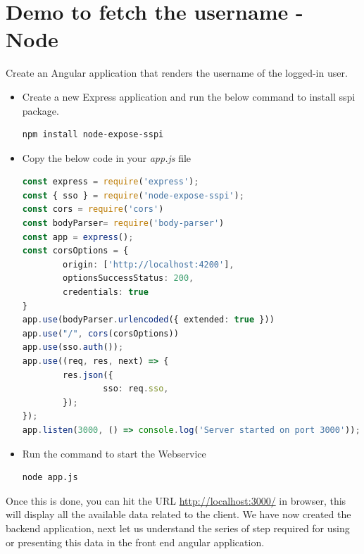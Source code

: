 \documentclass{report}
\begin{document}
\section{Demo to fetch the username - Node}
Create an Angular application that renders the username of the logged-in user.
\begin{itemize}
	\item{Create a new Express application and run the below command to install sspi package.}
	\begin{lstlisting}[language=bash]
		npm install node-expose-sspi
	\end{lstlisting}
\item{Copy the below code in your \textit{app.js} file}
		\begin{lstlisting}[language=Typescript, caption=app.js]
const express = require('express');
const { sso } = require('node-expose-sspi');
const cors = require('cors')
const bodyParser= require('body-parser')
const app = express();
const corsOptions = {
		origin: ['http://localhost:4200'],
		optionsSuccessStatus: 200,
		credentials: true
}
app.use(bodyParser.urlencoded({ extended: true }))
app.use("/", cors(corsOptions))
app.use(sso.auth());
app.use((req, res, next) => {
		res.json({
				sso: req.sso,
		});
});
app.listen(3000, () => console.log('Server started on port 3000'));
\end{lstlisting}
\item{Run the command to start the Webservice}
	\begin{lstlisting}[language=bash]
	node app.js
\end{lstlisting}
\end{itemize}
Once this is done, you can hit the URL \url{http://localhost:3000/} in browser, this will display all the available data related to the client.
We have now created the backend application, next let us understand the series of step required for using or presenting this data in the front end angular application.
\end{document}
